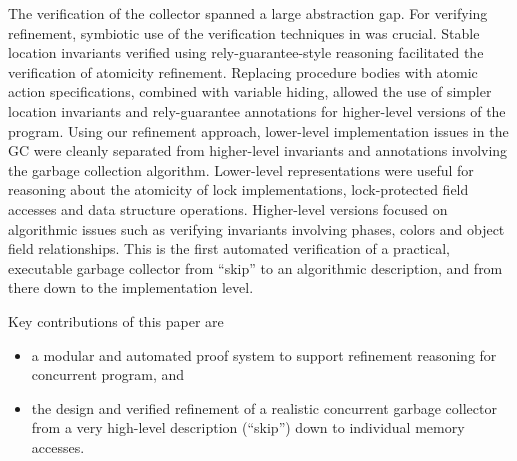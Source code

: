 The verification of the collector spanned a large abstraction gap. For verifying refinement, symbiotic use of the verification techniques in \civl was crucial. Stable location invariants verified using rely-guarantee-style reasoning facilitated the verification of atomicity refinement. Replacing procedure bodies with atomic action specifications, combined with variable hiding, allowed the use of simpler location invariants and rely-guarantee annotations for higher-level versions of the program.
Using our refinement approach, lower-level implementation issues in the GC were cleanly separated from higher-level invariants and annotations involving the garbage collection algorithm. Lower-level representations were useful for reasoning about the atomicity of lock implementations, lock-protected field accesses and data structure operations. Higher-level versions focused on algorithmic issues such as verifying invariants involving phases, colors and object field relationships. This is the first automated verification of a practical, executable garbage collector from ``skip'' to an algorithmic description, and from there down to the implementation level.

Key contributions of this paper are 
\begin{itemize}
\item a modular and automated proof system to support refinement reasoning for concurrent program, and 
\item the design and verified refinement of a realistic concurrent garbage collector from a very high-level description (``skip'') down to individual memory accesses.
\end{itemize}




